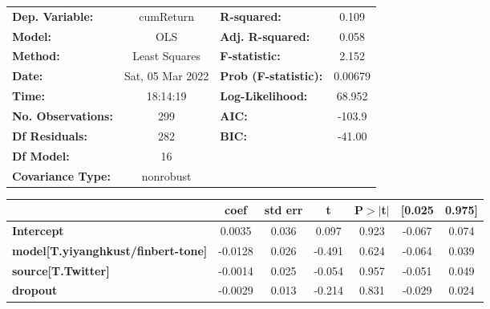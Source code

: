 \begin{center}
\begin{tabular}{lclc}
\toprule
\textbf{Dep. Variable:}                    &    cumReturn     & \textbf{  R-squared:         } &     0.109   \\
\textbf{Model:}                            &       OLS        & \textbf{  Adj. R-squared:    } &     0.058   \\
\textbf{Method:}                           &  Least Squares   & \textbf{  F-statistic:       } &     2.152   \\
\textbf{Date:}                             & Sat, 05 Mar 2022 & \textbf{  Prob (F-statistic):} &  0.00679    \\
\textbf{Time:}                             &     18:14:19     & \textbf{  Log-Likelihood:    } &    68.952   \\
\textbf{No. Observations:}                 &         299      & \textbf{  AIC:               } &    -103.9   \\
\textbf{Df Residuals:}                     &         282      & \textbf{  BIC:               } &    -41.00   \\
\textbf{Df Model:}                         &          16      & \textbf{                     } &             \\
\textbf{Covariance Type:}                  &    nonrobust     & \textbf{                     } &             \\
\bottomrule
\end{tabular}
\begin{tabular}{lcccccc}
                                           & \textbf{coef} & \textbf{std err} & \textbf{t} & \textbf{P$> |$t$|$} & \textbf{[0.025} & \textbf{0.975]}  \\
\midrule
\textbf{Intercept}                         &       0.0035  &        0.036     &     0.097  &         0.923        &       -0.067    &        0.074     \\
\textbf{model[T.yiyanghkust/finbert-tone]} &      -0.0128  &        0.026     &    -0.491  &         0.624        &       -0.064    &        0.039     \\
\textbf{source[T.Twitter]}                 &      -0.0014  &        0.025     &    -0.054  &         0.957        &       -0.051    &        0.049     \\
\textbf{dropout}                           &      -0.0029  &        0.013     &    -0.214  &         0.831        &       -0.029    &        0.024     \\

\end{tabular}
\end{center}
